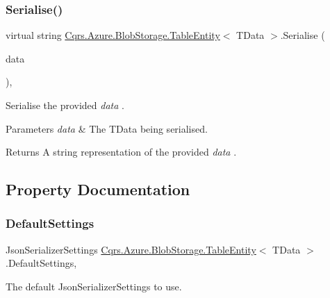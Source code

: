 \subsubsection{\texorpdfstring{Serialise()}{Serialise()}}
{\footnotesize\ttfamily virtual string \hyperlink{classCqrs_1_1Azure_1_1BlobStorage_1_1TableEntity}{Cqrs.\+Azure.\+Blob\+Storage.\+Table\+Entity}$<$ T\+Data $>$.Serialise (\begin{DoxyParamCaption}\item[{T\+Data}]{data }\end{DoxyParamCaption})\hspace{0.3cm}{\ttfamily [protected]}, {\ttfamily [virtual]}}



Serialise the provided {\itshape data} . 


\begin{DoxyParams}{Parameters}
{\em data} & The T\+Data being serialised.\\
\hline
\end{DoxyParams}
\begin{DoxyReturn}{Returns}
A string representation of the provided {\itshape data} .
\end{DoxyReturn}


\subsection{Property Documentation}
\mbox{\label{classCqrs_1_1Azure_1_1BlobStorage_1_1TableEntity_ab7a9041c7d8e5237cfb81ad98b6b3980_ab7a9041c7d8e5237cfb81ad98b6b3980}} 
\subsubsection{\texorpdfstring{Default\+Settings}{DefaultSettings}}
{\footnotesize\ttfamily Json\+Serializer\+Settings \hyperlink{classCqrs_1_1Azure_1_1BlobStorage_1_1TableEntity}{Cqrs.\+Azure.\+Blob\+Storage.\+Table\+Entity}$<$ T\+Data $>$.Default\+Settings\hspace{0.3cm}{\ttfamily [static]}, {\ttfamily [get]}}



The default Json\+Serializer\+Settings to use. 


